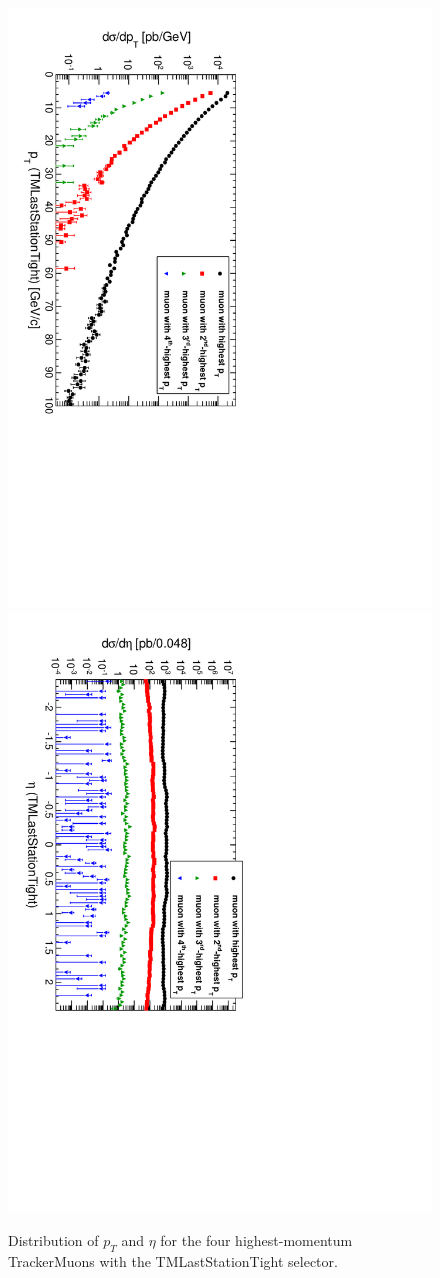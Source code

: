 \documentclass[12pt]{article}
\begin{document}
\begin{figure}
\includegraphics[height=0.5\linewidth, angle=90]{fig/backgroundsMatching_plot/ptcurves_TMLastStationTight.pdf}
\includegraphics[height=0.5\linewidth, angle=90]{fig/backgroundsMatching_plot/etacurves_TMLastStationTight.pdf}

\caption{Distribution of $p_T$ and $\eta$ for the four highest-momentum TrackerMuons with the TMLastStationTight selector. \label{fig:curves_TMLastStationTight}}
\end{figure}
\end{document}
